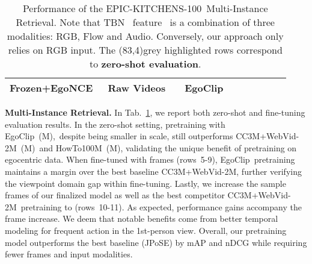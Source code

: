 \documentclass{article}
\newcommand{\dataset}{EgoClip}
\newcommand{\model}{EgoNCE\xspace}
\newcommand{\epic}{EPIC-KITCHENS-100}
\newcommand{\mir}{Multi-Instance Retrieval}
\newcommand{\ccweb}{CC3M+WebVid-2M}
\newcommand{\howto}{HowTo100M}
\begin{document}
\begin{table}[t]
{\begin{tabular}{lccc|cccccc}
    \rowcolor[gray]{0.9}
    Frozen+\model~& Raw Videos& & \dataset&  &  &  &   &  &  \\
    \bottomrule[1pt] 
\end{tabular}
}
\centering
\vspace{.5em}
\caption{
Performance of the \epic~Multi-Instance Retrieval.
Note that TBN~ feature~\cite{kazakos2019epic} is a combination of three modalities: RGB, Flow and Audio.
Conversely, our approach only relies on RGB input. 
The \colorbox{gray!20}{\makebox(83,4){grey highlighted rows}} correspond to \textbf{zero-shot evaluation}.
}
\vspace{-2.6em}
\label{mir}
\end{table}
 \textbf{\mir.}
In Tab.~\ref{mir}, we report both zero-shot and fine-tuning evaluation results. In the zero-shot setting, 
pretraining with \dataset~(M),~despite being smaller in scale, still outperforms  \ccweb~(M)~and \howto~(M), validating the unique benefit of pretraining on egocentric data.
When fine-tuned with  frames (rows~5-9), \dataset~pretraining  maintains a margin over the best baseline \ccweb, further verifying the viewpoint domain gap within fine-tuning.
Lastly, we increase the sample frames of our finalized model as well as the best competitor \ccweb~pretraining to  (rows~10-11).
As expected, performance gains accompany the frame increase. 
We deem that notable benefits come from better temporal modeling for frequent action in the 1st-person view. 
Overall, our pretraining model outperforms the best baseline (JPoSE) by  mAP and  nDCG while requiring fewer frames and input modalities.
\end{document}
